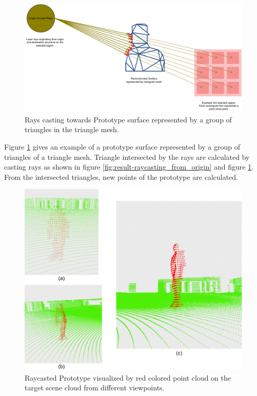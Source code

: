 \begin{figure}[htbp]
    \centering
    \begin{minipage}[b]{0.8\textwidth}
    \centering
    \includegraphics[width=1\linewidth]{97_graphics/results/raycasting_with_trianglesmeshes.pdf}
    \caption{Rays casting towards Prototype surface represented by a group of triangles in the triangle mesh.}
    \label{fig:result-raycasting_with_triangles}
    \end{minipage}
\end{figure}

Figure \ref{fig:result-raycasting_with_triangles} gives an example of a prototype surface represented by a group of triangles of a triangle mesh. Triangle intersected by the rays are calculated by casting rays as shown in figure \ref{fig:result-raycasting_from_origin}  and figure  \ref{fig:result-raycasting_with_triangles}. From the intersected triangles, new points of the prototype are calculated. 

\begin{figure}[htbp]
    \centering
    \includegraphics[width=0.6\linewidth]{97_graphics/results/raycasted_prototype.pdf}
    \caption{Raycasted Prototype visualized by red colored point cloud on the target scene cloud from different viewpoints.}
    \label{fig:result-raycasted_prototype}
\end{figure}

